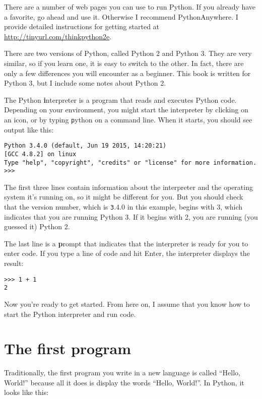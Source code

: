 \documentclass[
DIV=11,
fontsize=12,
twoside,
headinclude=false,
titlepage=firstiscover,
abstract=true,
headsepline=true,
footsepline=true,
chapterprefix=true, %
headings=big,
bibliography=totoc,%
captions=tableheading
]{scrbook}
\theoremstyle{definition}
\begin{document}
There are a number of web pages you can use to run Python.  If you
already have a favorite, go ahead and use it.  Otherwise I recommend
PythonAnywhere.  I provide detailed instructions for getting started
at \url{http://tinyurl.com/thinkpython2e}.  

There are two versions of Python, called Python 2 and Python 3.
They are very similar, so if you learn one, it is easy to switch
to the other.  In fact, there are only a few differences you will
encounter as a beginner.
This book is written for Python 3, but I include some notes
about Python 2.

The Python {\textbf interpreter} is a program that reads and executes
Python code.  Depending on your environment, you might start the
interpreter by clicking on an icon, or by typing {\texttt python} on
a command line. 
When it starts, you should see output like this:

\begin{lstlisting}
Python 3.4.0 (default, Jun 19 2015, 14:20:21) 
[GCC 4.8.2] on linux
Type "help", "copyright", "credits" or "license" for more information.
>>> 
\end{lstlisting}
%
The first three lines contain information about the interpreter
and the operating system it's running on, so it might be different for
you.  But you should check that the version number, which is
{\texttt 3.4.0} in this example, begins with 3, which indicates that
you are running Python 3.  If it begins with 2, you are running
(you guessed it) Python 2.

The last line is a {\textbf prompt} that indicates that the interpreter is
ready for you to enter code.
If you type a line of code and hit Enter, the interpreter displays the
result: 

\begin{lstlisting}
>>> 1 + 1
2
\end{lstlisting}
%
Now you're ready to get started.
From here on, I assume that you know how to start the Python
interpreter and run code.


\section{The first program}
\label{hello}

Traditionally, the first program you write in a new language
is called ``Hello, World!'' because all it does is display the
words ``Hello, World!''.  In Python, it looks like this:
\end{document}
